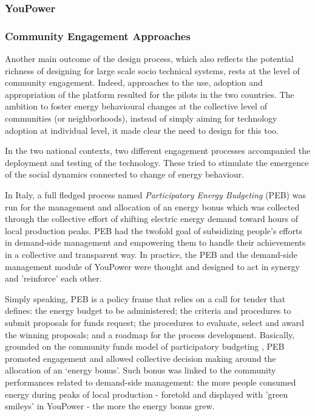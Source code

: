 \subsubsection{YouPower} %



\subsubsection{Community Engagement Approaches} %

Another main outcome of the design process, which also reflects the potential richness of designing for large scale socio technical systems, rests at the level of community engagement. Indeed, approaches to the
use, adoption and appropriation of the platform resulted for the pilots in the two countries. 
The ambition to foster energy behavioural changes at the collective level of communities (or neighborhoods),
instead of simply aiming for technology adoption at individual level, it made clear the need to design for
this too.

In the two national contexts, two different engagement processes accompanied the deployment and testing of the technology. These tried to stimulate the emergence of the social dynamics connected to change of energy behaviour. 

In Italy, a full fledged process named \textit{Participatory Energy Budgeting} (PEB) \cite{capaccioli_exploring_2017,capaccioli_exploring_2016}
was run for the management and allocation of an energy bonus which was
collected through the collective effort of shifting electric energy demand
toward hours of local production peaks.
PEB had the twofold goal of subsidizing people's efforts in demand-side management
and empowering them to handle their achievements in a collective and transparent way.
In practice, the PEB and the demand-side management module of YouPower
were thought and designed to act in synergy and 'reinforce' each other.

Simply speaking, PEB is a policy frame that relies on a call for tender that
defines: the energy budget to be administered;
the criteria and procedures to submit proposals for funds request; the procedures
to evaluate, select and award the winning proposals; and a roadmap for the process development. 
Basically, grounded on the community funds model of participatory budgeting \cite{Ganuza2012,Sintomer2008},
PEB promoted engagement and allowed collective decision
making around the allocation of an `energy bonus'. Such bonus
was linked to the community performances related to demand-side management:
the more people consumed energy during peaks of local production - foretold and displayed
with 'green smileys' in YouPower - the more the energy bonus grew.

